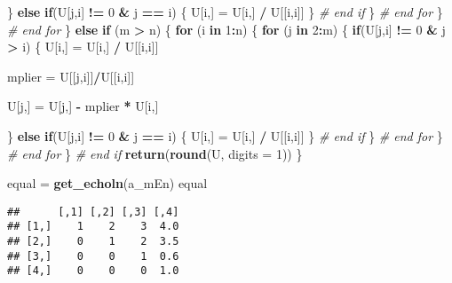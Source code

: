 \documentclass[]{article}
\newenvironment{Shaded}{\begin{snugshade}}{\end{snugshade}}
\newcommand{\CommentTok}[1]{\textcolor[rgb]{0.56,0.35,0.01}{\textit{#1}}}
\newcommand{\ControlFlowTok}[1]{\textcolor[rgb]{0.13,0.29,0.53}{\textbf{#1}}}
\newcommand{\DataTypeTok}[1]{\textcolor[rgb]{0.13,0.29,0.53}{#1}}
\newcommand{\DecValTok}[1]{\textcolor[rgb]{0.00,0.00,0.81}{#1}}
\newcommand{\KeywordTok}[1]{\textcolor[rgb]{0.13,0.29,0.53}{\textbf{#1}}}
\newcommand{\NormalTok}[1]{#1}
\newcommand{\OperatorTok}[1]{\textcolor[rgb]{0.81,0.36,0.00}{\textbf{#1}}}
\newcommand{\StringTok}[1]{\textcolor[rgb]{0.31,0.60,0.02}{#1}}
\begin{document}
\begin{Shaded}
\begin{Highlighting}[]
\NormalTok{        \} }\ControlFlowTok{else} \ControlFlowTok{if}\NormalTok{(U[j,i] }\OperatorTok{!=}\StringTok{ }\DecValTok{0} \OperatorTok{&}\StringTok{ }\NormalTok{j }\OperatorTok{==}\StringTok{ }\NormalTok{i) \{}
\NormalTok{          U[i,] =}\StringTok{ }\NormalTok{U[i,] }\OperatorTok{/}\StringTok{ }\NormalTok{U[[i,i]]}
\NormalTok{        \} }\CommentTok{# end if}
\NormalTok{      \} }\CommentTok{# end for}
\NormalTok{    \} }\CommentTok{# end for}
\NormalTok{  \} }\ControlFlowTok{else} \ControlFlowTok{if}\NormalTok{ (m }\OperatorTok{>}\StringTok{ }\NormalTok{n) \{}
    \ControlFlowTok{for}\NormalTok{ (i }\ControlFlowTok{in} \DecValTok{1}\OperatorTok{:}\NormalTok{n) \{}
      \ControlFlowTok{for}\NormalTok{ (j }\ControlFlowTok{in} \DecValTok{2}\OperatorTok{:}\NormalTok{m) \{}
        \ControlFlowTok{if}\NormalTok{(U[j,i] }\OperatorTok{!=}\StringTok{ }\DecValTok{0} \OperatorTok{&}\StringTok{ }\NormalTok{j }\OperatorTok{>}\StringTok{ }\NormalTok{i) \{}
\NormalTok{          U[i,] =}\StringTok{ }\NormalTok{U[i,] }\OperatorTok{/}\StringTok{ }\NormalTok{U[[i,i]]}

\NormalTok{          mplier =}\StringTok{ }\NormalTok{U[[j,i]]}\OperatorTok{/}\NormalTok{U[[i,i]]}
          
\NormalTok{          U[j,] =}\StringTok{ }\NormalTok{U[j,] }\OperatorTok{-}\StringTok{ }\NormalTok{mplier }\OperatorTok{*}\StringTok{ }\NormalTok{U[i,]}
          
\NormalTok{        \} }\ControlFlowTok{else} \ControlFlowTok{if}\NormalTok{(U[j,i] }\OperatorTok{!=}\StringTok{ }\DecValTok{0} \OperatorTok{&}\StringTok{ }\NormalTok{j }\OperatorTok{==}\StringTok{ }\NormalTok{i) \{}
\NormalTok{          U[i,] =}\StringTok{ }\NormalTok{U[i,] }\OperatorTok{/}\StringTok{ }\NormalTok{U[[i,i]]}
\NormalTok{        \} }\CommentTok{# end if}
\NormalTok{      \} }\CommentTok{# end for}
\NormalTok{    \} }\CommentTok{# end for}
\NormalTok{  \} }\CommentTok{# end if }
  \KeywordTok{return}\NormalTok{(}\KeywordTok{round}\NormalTok{(U, }\DataTypeTok{digits =} \DecValTok{1}\NormalTok{))}
\NormalTok{\}}

\NormalTok{equal =}\StringTok{ }\KeywordTok{get_echoln}\NormalTok{(a_mEn)}
\NormalTok{equal}
\end{Highlighting}
\end{Shaded}

\begin{verbatim}
##      [,1] [,2] [,3] [,4]
## [1,]    1    2    3  4.0
## [2,]    0    1    2  3.5
## [3,]    0    0    1  0.6
## [4,]    0    0    0  1.0
\end{verbatim}
\end{document}
